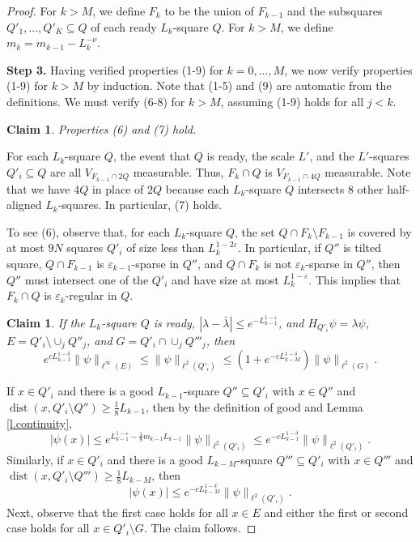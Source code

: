 \documentclass{amsart}
\newtheorem{claim}[equation]{Claim}
\newcommand{\lref}[1]{Lemma \ref{l.#1}}
\numberwithin{equation}{section}
\numberwithin{figure}{section}
\newcommand{\ep}{\varepsilon}
\newcommand{\dist}{\operatorname{dist}}
\begin{document}
\begin{proof}
For $k > M$, we define $F_k$ to be the union of $F_{k-1}$ and the subsquares $Q'_1, ..., Q'_K \subseteq Q$ of each ready $L_k$-square $Q$.  For $k > M$, we define $m_k = m_{k-1} - L_k^{-\nu}$.

{\bf Step 3.}  Having verified properties (1-9) for $k = 0, ..., M$, we now verify properties (1-9) for $k > M$ by induction.  Note that (1-5) and (9) are automatic from the definitions.  We must verify (6-8) for $k > M$, assuming (1-9) holds for all $j < k$.

\begin{claim}
Properties (6) and (7) hold.
\end{claim}

For each $L_k$-square $Q$, the event that $Q$ is ready, the scale $L'$, and the $L'$-squares $Q'_i \subseteq Q$ are all $V_{F_{k-1} \cap 2Q}$ measurable.  Thus, $F_k \cap Q$ is $V_{F_{k-1} \cap 4Q}$ measurable.  Note that we have $4Q$ in place of $2Q$ because each $L_k$-square $Q$ intersects $8$ other half-aligned $L_k$-squares.  In particular, (7) holds.

To see (6), observe that, for each $L_k$-square $Q$, the set $Q \cap F_k \setminus F_{k-1}$ is covered by at most $9N$ squares $Q'_i$ of size less than $L_k^{1-2\ep}$.  In particular, if $Q''$ is tilted square, $Q \cap F_{k-1}$ is $\ep_{k-1}$-sparse in $Q''$, and $Q \cap F_k$ is not $\ep_k$-sparse in $Q''$, then $Q''$ must intersect one of the $Q'_i$ and have size at most $L_k^{1-\ep}$.  This implies that $F_k \cap Q$ is $\ep_k$-regular in $Q$.

\begin{claim}
If the $L_k$-square $Q$ is ready, $|\lambda - \bar \lambda| \leq e^{-L_{k-1}^{1-\ep}}$, and $H_{Q'_i} \psi = \lambda \psi$, $E = Q'_i \setminus \cup_j Q''_j$, and $G = Q'_i \cap \cup_j Q'''_j$, then
\begin{equation*}
e^{cL_{k-1}^{1-\delta}} \| \psi \|_{\ell^\infty(E)} \leq \| \psi \|_{\ell^2(Q'_i)} \leq (1 + e^{-c L_{k-M}^{1-\delta}}) \| \psi \|_{\ell^2(G)}.
\end{equation*}
\end{claim}

If $x \in Q'_i$ and there is a good $L_{k-1}$-square $Q'' \subseteq Q'_i$ with $x \in Q''$ and $\dist(x, Q'_i \setminus Q'') \geq \tfrac18 L_{k-1}$, then by the definition of good and \lref{continuity},
\begin{equation*}
|\psi(x)| \leq e^{L_{k-1}^{1-\ep} - \tfrac18 m_{k-1} L_{k-1}} \| \psi \|_{\ell^2(Q'_i)} \leq e^{-c L_{k-1}^{1-\delta}} \| \psi \|_{\ell^2(Q'_i)}.
\end{equation*}
Similarly, if $x \in Q'_i$ and there is a good $L_{k-M}$-square $Q''' \subseteq Q'_i$ with $x \in Q'''$ and $\dist(x, Q'_i \setminus Q''') \geq \tfrac18 L_{k-M}$, then
\begin{equation*}
|\psi(x)| \leq e^{-c L_{k-M}^{1-\delta}} \| \psi \|_{\ell^2(Q'_i)}.
\end{equation*}
Next, observe that the first case holds for all $x \in E$ and either the first or second case holds for all $x \in Q'_i \setminus G$.  The claim follows.


\end{proof}
\end{document}
